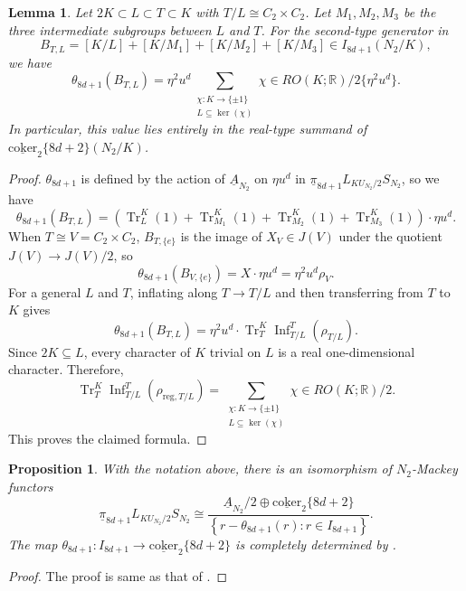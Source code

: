 \documentclass{amsart}
\theoremstyle{plain}
\newtheorem{lemma}[theorem]{Lemma}
\newtheorem{proposition}[theorem]{Proposition}
\theoremstyle{definition}
\theoremstyle{remark}
\begin{document}
\begin{lemma}\label{lem:theta-8d-plus-1-type-two}
Let $2K\subset L\subset T\subset K$ with $T/L\cong C_2\times C_2$. Let $M_1,M_2,M_3$ be the three intermediate subgroups between $L$ and $T$.  For the second-type generator in 
\[
B_{T,L} = [K/L]+[K/M_1]+[K/M_2]+[K/M_3] \in I_{8d+1}(N_2/K),
\]
we have 
\[
\theta_{8d+1}(B_{T,L}) = \eta^2u^d \sum_{\substack{\chi:K\to\{\pm1\}\\ L\subseteq\ker(\chi)}}\chi \in RO(K;\mathbb R)/2\{\eta^2u^d\}.
\]
In particular, this value lies entirely in the real-type summand of $\underline{\mathrm{coker}}_2\{8d+2\}(N_2/K)$.
\end{lemma}

\begin{proof}
$\theta_{8d+1}$ is defined by the action of $\underline{A}_{N_2}$ on $\eta u^d$ in $\underline{\pi}_{8d+1} L_{KU_{N_2}/2}S_{N_2}$, so we have 
\[
\theta_{8d+1}(B_{T,L}) = (\operatorname{Tr}_{L}^{K}(1) + \operatorname{Tr}_{M_1}^{K}(1) + \operatorname{Tr}_{M_2}^{K}(1) + \operatorname{Tr}_{M_3}^{K}(1))\cdot \eta u^d.
\]
When $T\cong V=C_2\times C_2$, $B_{T,\{e\}}$ is the image of $X_V\in J(V)$ under the quotient $J(V)\to J(V)/2$, so
\[
\theta_{8d+1}(B_{V,\{e\}}) = X\cdot \eta u^d = \eta^2u^d \rho_{V}.
\]
For a general $L$ and $T$, inflating along $T\to T/L$ and then transferring from $T$ to $K$
gives
\[
\theta_{8d+1}(B_{T,L}) = \eta^2u^d\cdot \operatorname{Tr}_{T}^{K} \operatorname{Inf}_{T/L}^{T} (\rho_{T/L}).
\]
Since $2K\subseteq L$, every character of $K$ trivial on $L$ is a
real one-dimensional character.  Therefore,
\[
\operatorname{Tr}_{T}^{K} \operatorname{Inf}_{T/L}^{T} (\rho_{\mathrm{reg},T/L})= \sum_{\substack{\chi:K\to\{\pm1\}\\ L\subseteq\ker(\chi)}}\chi \in RO(K;\mathbb R)/2.
\]
This proves the claimed formula.
\end{proof}


\begin{proposition}\label{prop:theta-8d-plus-1-determined}
With the notation above, there is an isomorphism of $N_2$-Mackey functors
\[
\underline{\pi}_{8d+1}L_{KU_{N_2}/2}S_{N_2}
\cong
\frac{
\underline A_{N_2}/2
\oplus
\underline{\mathrm{coker}}_2\{8d+2\}
}{
\left\{ r-\theta_{8d+1}(r): r\in I_{8d+1} \right\}
}.
\]
The map $\theta_{8d+1}:I_{8d+1} \to  \underline{\mathrm{coker}}_2\{8d+2\} $ is completely determined by 
.
\end{proposition}
\begin{proof}
    The proof is same as that of .
\end{proof}
\end{document}
